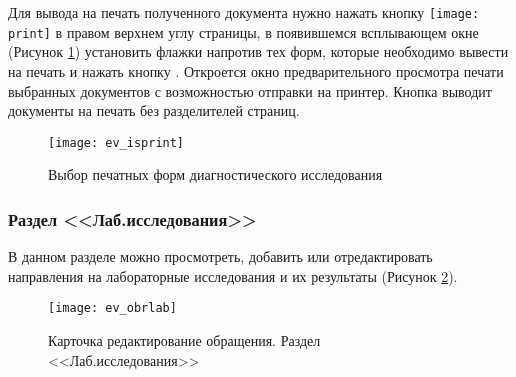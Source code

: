 

Для вывода на печать полученного документа нужно нажать кнопку \texttt{[image: print]} в правом верхнем углу страницы, в появившемся всплывающем окне (Рисунок \ref{img_ev_isprint}) установить флажки напротив тех форм, которые необходимо вывести на печать и нажать кнопку . Откроется окно предварительного просмотра печати выбранных документов с возможностью отправки на принтер. Кнопка  выводит документы на печать без разделителей страниц.

 \begin{figure}[ht]\centering
   \texttt{[image: ev\_isprint]}
   \caption{Выбор печатных форм диагностического исследования}
   \label{img_ev_isprint}
 \end{figure}

\subsubsection{Раздел <<Лаб.исследования>>}

В данном разделе можно просмотреть, добавить или отредактировать направления на лабораторные исследования и их результаты (Рисунок \ref{img_ev_obrlab}).

\begin{figure}[ht]\centering
 \texttt{[image: ev\_obrlab]}
 \caption{Карточка редактирование обращения. Раздел <<Лаб.исследования>>}
 \label{img_ev_obrlab}
\end{figure}

